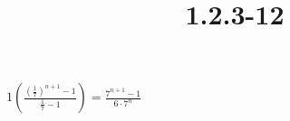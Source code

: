 \documentclass{article}
\title{1.2.3-12}
\begin{document}
\maketitle

\( 1(\frac{(\frac{1}{7})^{n+1} - 1}{\frac{1}{7} - 1}) = \frac{7^{n+1} - 1}{6\cdot7^n} \)
\end{document}
